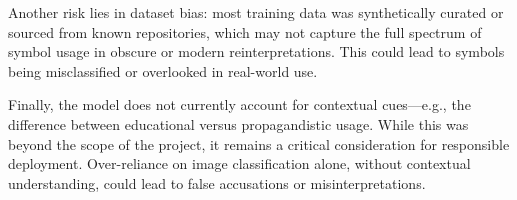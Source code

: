 Another risk lies in dataset bias: most training data was synthetically curated or sourced from known repositories,
which may not capture the full spectrum of symbol usage in obscure or modern reinterpretations. This could lead to
symbols being misclassified or overlooked in real-world use.

Finally, the model does not currently account for contextual cues—e.g., the difference between educational versus
propagandistic usage. While this was beyond the scope of the project, it remains a critical consideration for
responsible deployment. Over-reliance on image classification alone, without contextual understanding, could lead to
false accusations or misinterpretations.
